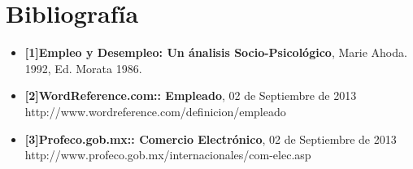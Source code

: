 \section{Bibliografía} 
  \vspace{1 cm}

\begin{itemize}
	\item \textbf{[1]Empleo y Desempleo: Un ánalisis Socio-Psicológico}, Marie Ahoda. 1992, Ed. Morata 1986.
	\item \textbf{[2]WordReference.com:: Empleado}, 02 de Septiembre de 2013
	\newline http://www.wordreference.com/definicion/empleado
	
	\item \textbf{[3]Profeco.gob.mx:: Comercio Electrónico}, 02 de Septiembre de 2013
	\newline http://www.profeco.gob.mx/internacionales/com-elec.asp

\end{itemize}






